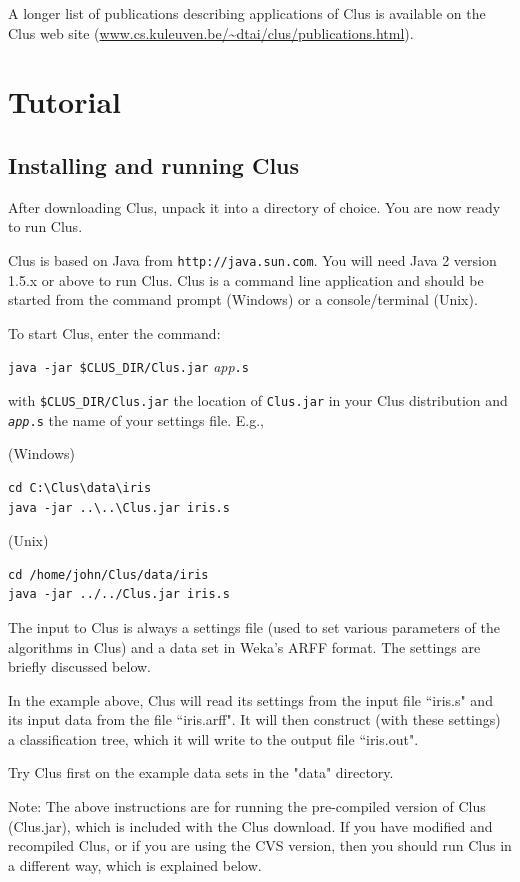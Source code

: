 \documentclass[a4paper]{report}
\begin{document}
A longer list of publications describing applications of Clus is available on the Clus web site
(\url{www.cs.kuleuven.be/~dtai/clus/publications.html}).

\chapter{Tutorial}

\section{Installing and running Clus}

After downloading Clus, unpack it into a directory of choice.
You are now ready to run Clus.

Clus is based on Java from {\tt http://java.sun.com}. You will need 
Java 2 version 1.5.x or above to run Clus. Clus is a command line 
application and should be started from the command prompt
(Windows) or a console/terminal (Unix).

To start Clus, enter the command:
\begin{flushleft}
\verb^java -jar $CLUS_DIR/Clus.jar^ {\em app}\verb^.s^
\end{flushleft}

with \verb^$CLUS_DIR/Clus.jar^ the location of \verb^Clus.jar^ in your Clus 
distribution and {\tt {\em app}.s} the name of your settings file. E.g.,

(Windows)
\begin{verbatim}
cd C:\Clus\data\iris
java -jar ..\..\Clus.jar iris.s
\end{verbatim}

(Unix)
\begin{verbatim}
cd /home/john/Clus/data/iris
java -jar ../../Clus.jar iris.s
\end{verbatim}

The input to Clus is always a settings file (used to set various 
parameters of the algorithms in Clus) and a data set in Weka's 
ARFF format. The settings are briefly discussed below.

In the example above, Clus will read its settings from the input file 
``iris.s" and its input data from the file ``iris.arff". It will then construct 
(with these settings) a classification tree, which it will write to the 
output file ``iris.out".

Try Clus first on the example data sets in the "data" directory.

Note: The above instructions are for running the pre-compiled version 
of Clus (Clus.jar), which is included with the Clus download. If you have 
modified and recompiled Clus, or if you are using the CVS version, then
you should run Clus in a different way, which is explained below.
\end{document}

